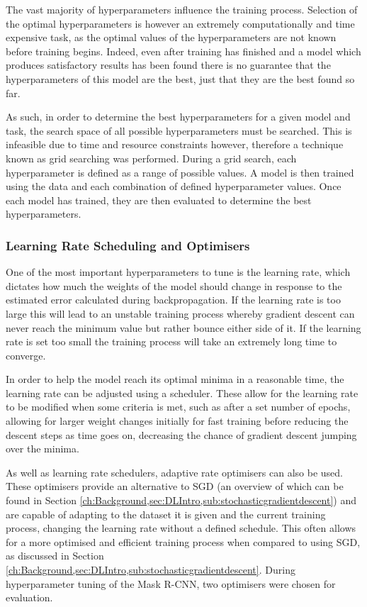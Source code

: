 The vast majority of hyperparameters influence the training process. Selection of the optimal hyperparameters is however an extremely computationally and time expensive task, as the optimal values of the hyperparameters are not known before training begins. Indeed, even after training has finished and a model which produces satisfactory results has been found there is no guarantee that the hyperparameters of this model are the best, just that they are the best found so far. 

As such, in order to determine the best hyperparameters for a given model and task, the search space of all possible hyperparameters must be searched. This is infeasible due to time and resource constraints however,  therefore a technique known as grid searching was performed. During a grid search, each hyperparameter is defined as a range of possible values. A model is then trained using the data and each combination of defined hyperparameter values. Once each model has trained, they are then evaluated to determine the best hyperparameters.

\subsubsection{Learning Rate Scheduling and Optimisers}\label{ch:cetDet,sec:ModelSelection,sub:TrainingHyperparameters,subsub:learningRateOptimisers}
One of the most important hyperparameters to tune is the learning rate, which dictates how much the weights of the model should change in response to the estimated error calculated during backpropagation. If the learning rate is too large this will lead to an unstable training process whereby gradient descent can never reach the minimum value but rather bounce either side of it. If the learning rate is set too small the training process will take an extremely long time to converge. 

In order to help the model reach its optimal minima in a reasonable time, the learning rate can be adjusted using a scheduler. These allow for the learning rate to be modified when some criteria is met, such as after a set number of epochs, allowing for larger weight changes initially for fast training before reducing the descent steps as time goes on, decreasing the chance of gradient descent jumping over the minima.

As well as learning rate schedulers, adaptive rate optimisers can also be used. These optimisers provide an alternative to SGD (an overview of which can be found in Section \ref{ch:Background,sec:DLIntro,sub:stochasticgradientdescent}) and are capable of adapting to the dataset it is given and the current training process, changing the learning rate without a defined schedule. This often allows for a more optimised and efficient training process when compared to using SGD, as discussed in Section \ref{ch:Background,sec:DLIntro,sub:stochasticgradientdescent}. During hyperparameter tuning of the Mask R-CNN, two optimisers were chosen for evaluation. 

